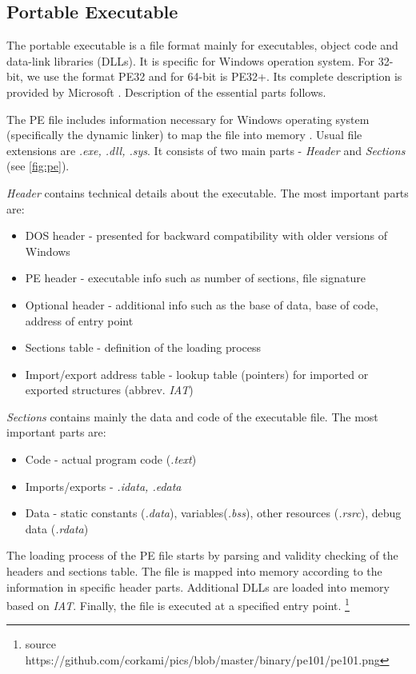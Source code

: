 \subsection{Portable Executable}
The portable executable is a file format mainly for executables, object code and data-link libraries (DLLs). It is specific for Windows operation system. For 32-bit, we use the format PE32 and for 64-bit is PE32+. Its complete description is provided by Microsoft \cite{PEFormat89:online}. Description of the essential parts follows.

The PE file includes information necessary for Windows operating system (specifically the dynamic linker) to map the file into memory \cite{Gibert2020}. Usual file extensions are \emph{.exe, .dll, .sys}. It consists of two main parts - \emph{Header} and \emph{Sections} (see \ref{fig:pe}). 

\emph{Header} contains technical details about the executable. The most important parts are:
\begin{itemize}
  \itemsep0em 
  \item DOS header - presented for backward compatibility with older versions of Windows
  \item PE header - executable info such as number of sections, file signature
  \item Optional header - additional info such as the base of data, base of code, address of entry point
  \item Sections table - definition of the loading process
  \item Import/export address table - lookup table (pointers) for imported or exported structures (abbrev. \emph{IAT})
\end{itemize}

\emph{Sections} contains mainly the data and code of the executable file. The most important parts are:
\begin{itemize}
  \itemsep0em 
  \item Code - actual program code (\emph{.text})
  \item Imports/exports - \emph{.idata, .edata}
  \item Data - static constants (\emph{.data}), variables(\emph{.bss}), other resources (\emph{.rsrc}), debug data (\emph{.rdata})
\end{itemize}

The loading process of the PE file starts by parsing and validity checking of the headers and sections table. The file is mapped into memory according to the information in specific header parts. Additional DLLs are loaded into memory based on \emph{IAT}. Finally, the file is executed at a specified entry point. \footnote{source https://github.com/corkami/pics/blob/master/binary/pe101/pe101.png}

